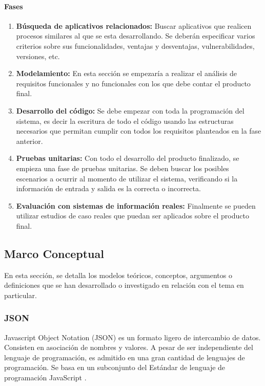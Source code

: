 \documentclass[12pt,a4paper,final]{article}
\begin{document}
	\paragraph{Fases}
	
	\begin{enumerate}
		\item \textbf{Búsqueda de aplicativos relacionados:} Buscar aplicativos que realicen procesos similares al que se esta desarrollando. Se deberán especificar varios criterios sobre sus funcionalidades, ventajas y desventajas, vulnerabilidades, versiones, etc. 
		\item \textbf{Modelamiento:} En esta sección se empezaría a realizar el análisis de requisitos funcionales y no funcionales con los que debe contar el producto final.
		\item \textbf{Desarrollo del código:} Se debe empezar con toda la programación del sistema, es decir la escritura de todo el código usando las estructuras necesarios que permitan cumplir con todos los requisitos planteados en la fase anterior. 
		\item \textbf{Pruebas unitarias:} Con todo el desarrollo del producto finalizado, se empieza una fase de pruebas unitarias. Se deben buscar los posibles escenarios a ocurrir al momento de utilizar el sistema,  verificando si la información de entrada y salida es la correcta o incorrecta. 		
		\item \textbf{Evaluación con sistemas de información reales:} Finalmente se pueden utilizar estudios de caso reales que puedan ser aplicados sobre el producto final.
	\end{enumerate}
	
	\subsection{Marco Conceptual}
	En esta sección, se detalla los modelos teóricos, conceptos, argumentos o definiciones que se han desarrollado o investigado en relación con el tema en particular.
	
	\subsubsection{JSON}
	
	Javascript Object Notation (JSON) es un formato ligero de intercambio de datos. Consisten en asociación de nombres y valores. A pesar de ser independiente del lenguaje de programación, es admitido en una gran cantidad de lenguajes de programación. Se basa en un subconjunto del Estándar de lenguaje de programación JavaScript \cite{JSON}.
	
\end{document}
